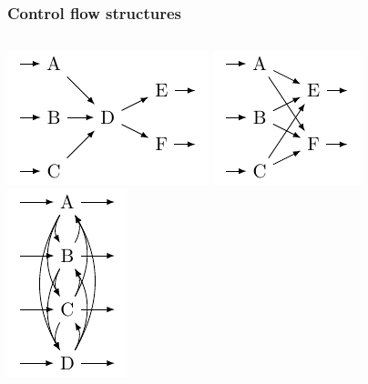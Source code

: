 \documentclass{beamer}
\begin{document}
\begin{frame}
\frametitle{Control flow structures}
\begin{columns}
\includegraphics[width=0.9\linewidth]{img/sequence_xor_event_xor.pdf}
\includegraphics[width=0.9\linewidth]{img/sequence_xor_xor.pdf}
\includegraphics[width=0.6\linewidth]{img/and.pdf}

\end{columns}
\end{frame}
\end{document}
